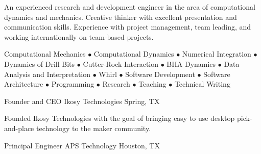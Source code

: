 \documentclass{resume}
\begin{document}
	\thispagestyle{lefooterhorizontalline}
	\makeresumeheaderC
	
	An experienced research and development engineer in the area of computational dynamics and mechanics. Creative thinker with excellent presentation and communication skills. Experience with project management, team leading, and working internationally on team-based projects.

	Computational Mechanics $\bullet$ Computational Dynamics $\bullet$ Numerical Integration $\bullet$ Dynamics of Drill Bits $\bullet$ Cutter-Rock Interaction $\bullet$ BHA Dynamics $\bullet$ Data Analysis and Interpretation $\bullet$ Whirl $\bullet$ Software Development $\bullet$ Software Architecture $\bullet$ Programming $\bullet$ Research $\bullet$ Teaching $\bullet$ Technical Writing

    
            {Founder and CEO}
            {Ikosy Technologies}
			{Spring, TX}
			
					\noindent Founded Ikosy Technologies with the goal of bringing easy to use desktop pick-and-place technology to the maker community.\hspace*{0pt}\\ \vspace*{-2pt}
				
            {Principal Engineer}
            {APS Technology}
			{Houston, TX}
			
\end{document}
